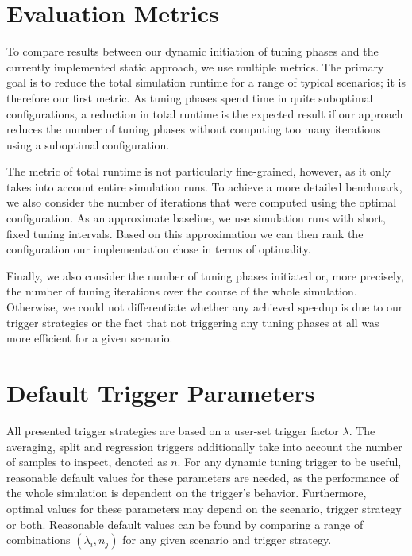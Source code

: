 \section{Evaluation Metrics}
\label{sec:metrics}
To compare results between our dynamic initiation of tuning phases and the currently implemented static approach, we use multiple metrics.
The primary goal is to reduce the total simulation runtime for a range of typical scenarios; it is therefore our first metric. As tuning phases spend time in quite suboptimal configurations, a reduction in total runtime is the expected result if our approach reduces the number of tuning phases without computing too many iterations using a suboptimal configuration.

The metric of total runtime is not particularly fine-grained, however, as it only takes into account entire simulation runs. To achieve a more detailed benchmark, we also consider the number of iterations that were computed using the optimal configuration. As an approximate baseline, we use simulation runs with short, fixed tuning intervals. Based on this approximation we can then rank the configuration our implementation chose in terms of optimality.

Finally, we also consider the number of tuning phases initiated or, more precisely, the number of tuning iterations over the course of the whole simulation. Otherwise, we could not differentiate whether any achieved speedup is due to our trigger strategies or the fact that not triggering any tuning phases at all was more efficient for a given scenario.

\section{Default Trigger Parameters}
\label{sec:default_params}
All presented trigger strategies are based on a user-set trigger factor $\lambda$. The averaging, split and regression triggers additionally take into account the number of samples to inspect, denoted as $n$. For any dynamic tuning trigger to be useful, reasonable default values for these parameters are needed, as the performance of the whole simulation is dependent on the trigger's behavior.
Furthermore, optimal values for these parameters may depend on the scenario, trigger strategy or both.
Reasonable default values can be found by comparing a range of combinations $\left(\lambda_i, n_j\right)$ for any given scenario and trigger strategy.
